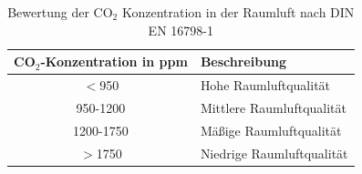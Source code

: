 \documentclass[a4paper,
    11pt,
    headings=small,
    ngerman,
    listof=totoc,
    numbers=noenddot]{scrreprt}[2021/11/13]
\begin{document}
\begin{table}[htbp]
  \centering
  \renewcommand{\arraystretch}{1.25}
  \caption{Bewertung der CO$_2$ Konzentration in der Raumluft nach DIN EN 16798-1 \autocite{din_en_16798}}
  \begin{tabular}{c|p{}}
    CO$_2$-Konzentration in \ac{ppm} & Beschreibung              \\
    \hline
    $<$950                           & Hohe Raumluftqualität     \\
    950-1200                         & Mittlere Raumluftqualität \\
    1200-1750                        & Mäßige Raumluftqualität   \\
    $>$1750                          & Niedrige Raumluftqualität \\
  \end{tabular}
  \label{appendix:tab:din_table_co2}
\end{table}
\end{document}
